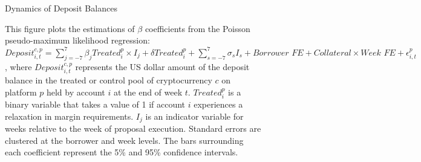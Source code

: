 \begin{figure}[ht!]
\centering
\caption{Dynamics of Deposit Balances}\label{fig:dynamics_deposit}
\caption*{This figure plots the estimations of $\beta$ coefficients from the Poisson pseudo-maximum likelihood regression: $Deposit_{i,t}^{c,p}=\sum_{j=-7}^{7}\beta_jTreated_{i}^p\times I_j+\delta Treated_{i}^p+\sum_{s=-7}^{7}\sigma_sI_s+\textit{Borrower FE} + \textit{Collateral}\times\textit{Week FE}+\epsilon_{i,t}^p$, where $Deposit_{i,t}^{c,p}$ represents the US dollar amount of the deposit balance in the treated or control pool of cryptocurrency $c$ on platform $p$ held by account $i$ at the end of week $t$. $Treated_{i}^{p}$ is a binary variable that takes a value of 1 if account $i$ experiences a relaxation in margin requirements. $I_j$ is an indicator variable for weeks relative to the week of proposal execution. Standard errors are clustered at the borrower and week levels. The bars surrounding each coefficient represent the 5\% and 95\% confidence intervals. }

\bigskip


\end{figure}


\clearpage
\newpage


